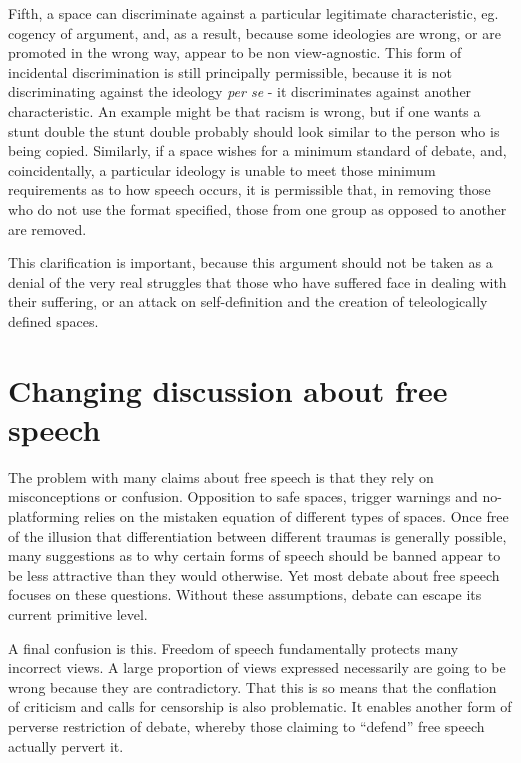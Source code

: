 \documentclass[10pt,a4paper,twoside]{article}
\begin{document}
\begin{multicols}{2}
Fifth, a space can discriminate against a particular legitimate
characteristic, eg. cogency of argument, and, as a result, because some
ideologies are wrong, or are promoted in the wrong way, appear to be non
view-agnostic. This form of incidental discrimination is still
principally permissible, because it is not discriminating against the
ideology \emph{per se} - it discriminates against another
characteristic. An example might be that racism is wrong, but if one
wants a stunt double the stunt double probably should look similar to
the person who is being copied. Similarly, if a space wishes for a
minimum standard of debate, and, coincidentally, a particular ideology
is unable to meet those minimum requirements as to how speech occurs, it
is permissible that, in removing those who do not use the format
specified, those from one group as opposed to another are removed.

This clarification is important, because this argument should not be
taken as a denial of the very real struggles that those who have
suffered face in dealing with their suffering, or an attack on
self-definition and the creation of teleologically defined spaces.

\section{Changing discussion about free
	speech}\label{changing-discussion-about-free-speech}

The problem with many claims about free speech is that they rely on
misconceptions or confusion. Opposition to safe spaces, trigger warnings
and no-platforming relies on the mistaken equation of different types of
spaces. Once free of the illusion that differentiation between different
traumas is generally possible, many suggestions as to why certain forms
of speech should be banned appear to be less attractive than they would
otherwise. Yet most debate about free speech focuses on these questions.
Without these assumptions, debate can escape its current primitive
level.

A final confusion is this. Freedom of speech fundamentally protects many
incorrect views. A large proportion of views expressed necessarily are
going to be wrong because they are contradictory. That this is so means
that the conflation of criticism and calls for censorship is also
problematic. It enables another form of perverse restriction of debate,
whereby those claiming to ``defend'' free speech actually pervert it.


\end{multicols}
\end{document}
